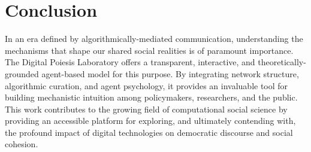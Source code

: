 \documentclass[11pt]{article}
\begin{document}
\section{Conclusion}

In an era defined by algorithmically-mediated communication, understanding the mechanisms that shape our shared social realities is of paramount importance. The Digital Poiesis Laboratory offers a transparent, interactive, and theoretically-grounded agent-based model for this purpose. By integrating network structure, algorithmic curation, and agent psychology, it provides an invaluable tool for building mechanistic intuition among policymakers, researchers, and the public. This work contributes to the growing field of computational social science by providing an accessible platform for exploring, and ultimately contending with, the profound impact of digital technologies on democratic discourse and social cohesion.
\end{document}
